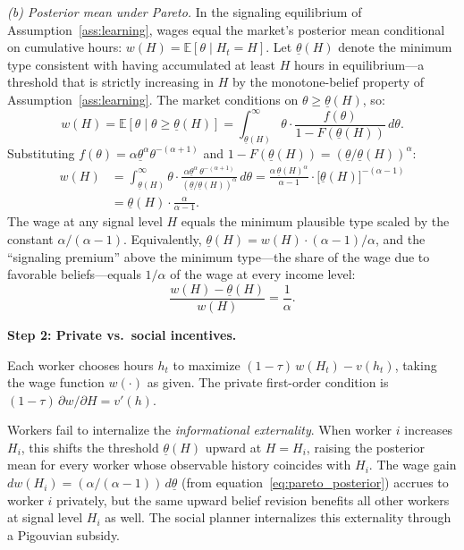 \documentclass[12pt]{article}
\theoremstyle{definition}
\theoremstyle{remark}
\begin{document}
\medskip
\noindent\textit{(b) Posterior mean under Pareto.} In the signaling equilibrium of
Assumption~\ref{ass:learning}, wages equal the market's posterior mean conditional on
cumulative hours: $w(H) = \mathbb{E}[\theta \mid H_t = H]$. Let $\underline{\theta}(H)$ denote
the minimum type consistent with having accumulated at least $H$ hours in equilibrium---a
threshold that is strictly increasing in $H$ by the monotone-belief property of
Assumption~\ref{ass:learning}. The market conditions on $\theta \geq \underline{\theta}(H)$, so:
\begin{equation}
\label{eq:pareto_posterior}
w(H) = \mathbb{E}[\theta \mid \theta \geq \underline{\theta}(H)]
= \int_{\underline{\theta}(H)}^{\infty} \theta \cdot
  \frac{f(\theta)}{1-F(\underline{\theta}(H))}\,d\theta.
\end{equation}
Substituting $f(\theta) = \alpha\underline{\theta}^\alpha\theta^{-(\alpha+1)}$ and
$1-F(\underline{\theta}(H)) = (\underline{\theta}/\underline{\theta}(H))^\alpha$:
\begin{align*}
w(H)
&= \int_{\underline{\theta}(H)}^{\infty} \theta \cdot
   \frac{\alpha\underline{\theta}^\alpha\,\theta^{-(\alpha+1)}}{(\underline{\theta}/
   \underline{\theta}(H))^\alpha}\,d\theta
= \frac{\alpha\,\underline{\theta}(H)^\alpha}{\alpha - 1}\cdot
  \bigl[\underline{\theta}(H)\bigr]^{-(\alpha-1)} \\
&= \underline{\theta}(H)\cdot\frac{\alpha}{\alpha-1}.
\end{align*}
The wage at any signal level $H$ equals the minimum plausible type scaled by the constant
$\alpha/(\alpha-1)$. Equivalently, $\underline{\theta}(H) = w(H)\cdot(\alpha-1)/\alpha$, and
the ``signaling premium'' above the minimum type---the share of the wage due to favorable
beliefs---equals $1/\alpha$ of the wage at every income level:
\begin{equation}
\label{eq:signaling_premium}
\frac{w(H) - \underline{\theta}(H)}{w(H)} = \frac{1}{\alpha}.
\end{equation}

\medskip
\noindent \textbf{Step 2: Private vs.\ social incentives.}

Each worker chooses hours $h_t$ to maximize $(1-\tau)\,w(H_t) - v(h_t)$, taking the wage
function $w(\cdot)$ as given. The private first-order condition is $(1-\tau)\,\partial w/\partial H = v'(h)$.

Workers fail to internalize the \emph{informational externality}. When worker $i$ increases
$H_i$, this shifts the threshold $\underline{\theta}(H)$ upward at $H = H_i$, raising the
posterior mean for every worker whose observable history coincides with $H_i$. The wage gain
$dw(H_i) = (\alpha/(\alpha-1))\,d\underline{\theta}$ (from equation~\eqref{eq:pareto_posterior})
accrues to worker $i$ privately, but the same upward belief revision benefits all other workers
at signal level $H_i$ as well. The social planner internalizes this externality through a
Pigouvian subsidy.
\end{document}
